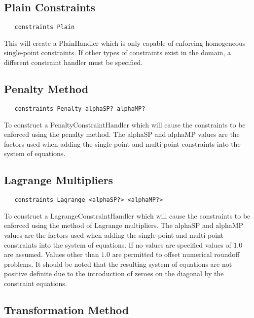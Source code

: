 \documentclass[12pt]{article}
\begin{document}
\subsection{Plain Constraints}

{\sf\small
\begin{verbatim}
   constraints Plain
\end{verbatim}
}

\noindent This will create a PlainHandler which is only capable of enforcing
homogeneous single-point constraints. If other types of constraints
exist in the domain, a different constraint handler must be specified.

\subsection{Penalty Method}

{\sf\small
\begin{verbatim}
   constraints Penalty alphaSP? alphaMP?
\end{verbatim}
}

\noindent To construct a PenaltyConstraintHandler which will cause the
constraints to be enforced using the penalty method. The alphaSP and
alphaMP values are the factors used when adding the single-point and
multi-point constraints into the system of equations.

\subsection{Lagrange Multipliers}

{\sf\small
\begin{verbatim}
   constraints Lagrange <alphaSP?> <alphaMP?>
\end{verbatim}
}

\noindent To construct a LagrangeConstraintHandler which will cause the
constraints to be enforced using the method of Lagrange multipliers. The alphaSP and
alphaMP values are the factors used when adding the single-point and
multi-point constraints into the system of equations. If no values are specified
values of $1.0$ are assumed. Values other than $1.0$ are permitted to offset numerical
roundoff problems. It should be
noted that the resulting system of equations are not positive definite
due to the introduction of zeroes on the diagonal by the constraint equations.

\subsection{Transformation Method}
\end{document}
